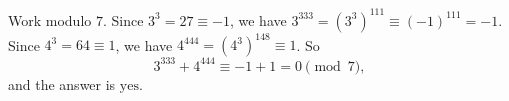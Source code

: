 Work modulo $7$. Since $3^3=27\equiv-1$, we have $3^{333}=(3^3)^{111}\equiv(-1)^{111}=-1$. Since $4^3=64\equiv1$, we have $4^{444}=(4^3)^{148}\equiv1$. So
\[
3^{333}+4^{444}\equiv-1+1=0\pmod 7,
\]
and the answer is $\boxed{\text{yes}}$.
